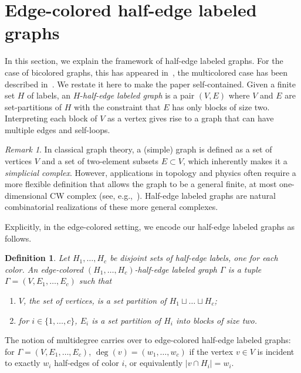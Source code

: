 \documentclass[a4paper,oneside]{amsart}
\numberwithin{theorem}{section}
\newtheorem{definition}[theorem]{Definition}
\theoremstyle{remark}
\newtheorem{remark}[theorem]{Remark}
\begin{document}
\section{Edge-colored half-edge labeled graphs}\label{sec:edge-colored_graphs}

In this section, we explain the framework of half-edge labeled graphs. For the case of bicolored graphs, this has appeared in~\cite[\S 3]{BMW24:Bicolored}, the multicolored case has been described in~\cite[\S 2]{LeeYang}.  We restate it here to make the paper self-contained.
Given a finite set $H$ of labels, an $H$-\emph{half-edge labeled graph} is a pair $(V,E)$ where $V$ and $E$ are set-partitions of $H$ with the constraint that $E$ has only blocks of size two. Interpreting each block of $V$ as a vertex gives rise to a graph that can have multiple edges and self-loops. 

\begin{remark}
In classical graph theory, a (simple) graph is defined as a set of vertices $V$ and a set of two-element subsets $E \subset V$, which inherently makes it a \emph{simplicial complex}. However, applications in topology and physics often require a more flexible definition that allows the graph to be a general finite, at most one-dimensional
CW complex (see, e.g.,~\cite{MR603127,MR4896115}). Half-edge labeled graphs are natural combinatorial realizations of these more general complexes.
\end{remark}

Explicitly, in the edge-colored setting, we encode our half-edge labeled graphs as follows.

\begin{definition}
  \label{def:multicolored_half_edge_label}
  Let $H_1,\dots,H_c$ be disjoint sets of half-edge labels, one for each color. An edge-colored $(H_1,\dots,H_c)$-\emph{half-edge labeled graph} $\Gamma$ is a tuple $\Gamma = (V, E_{1},\dots, E_{c})$ such that 
  \begin{enumerate}
    \item $V$, the set of vertices, is a set partition of $H_1 \sqcup \dots \sqcup H_c$;
    \item for $i\in\{1,\dots,c\}$, $E_{i}$ is a set partition of $H_i$ into blocks of size two.
  \end{enumerate}
\end{definition}

The notion of multidegree carries over to edge-colored half-edge labeled graphs: 
for $\Gamma = (V, E_{1},\dots, E_{c})$, $\deg(v) = (w_1,\dots,w_c)$ if the vertex $v \in V$ is incident to exactly $w_i$ half-edges of color $i$, or equivalently $|v \cap H_i| = w_i$. 
\end{document}
